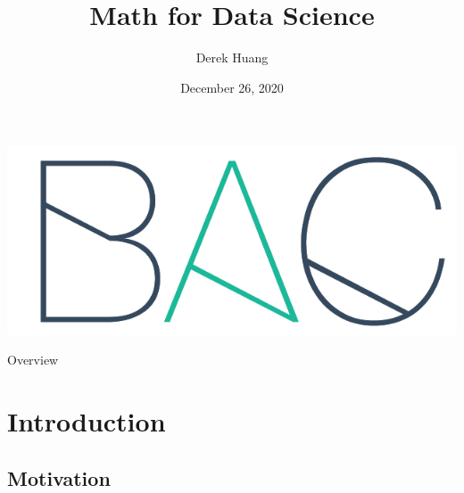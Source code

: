 \documentclass{beamer}
\title[Math for Data Science]{Math for Data Science}
\author[Derek Huang (BAC Advanced Team)]{Derek Huang}
\institute[BAC Advanced Team]{BAC Advanced Team}
\date[December 26, 2020]{December 26, 2020}
\begin{document}
\begin{frame}
    \titlepage
    \centering
    \includegraphics[scale = 0.1]{../bac_logo1.png}
\end{frame}

\begin{frame}{Overview}
	\tableofcontents
\end{frame}

\section{Introduction}

\subsection{Motivation}
\end{document}
